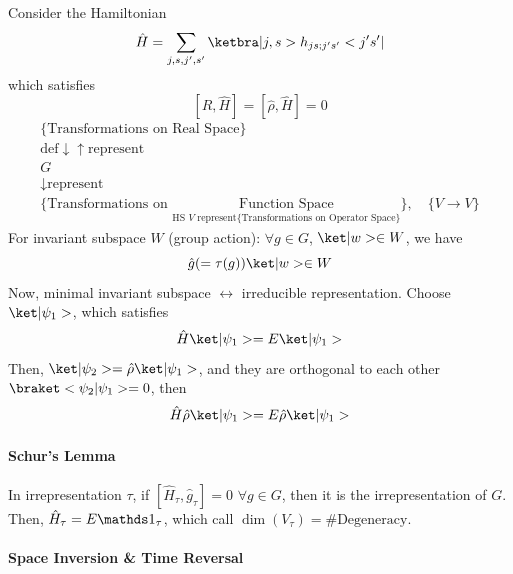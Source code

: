 Consider the Hamiltonian
\[
  \hat H = \sum_{j,s,j',s'} \ketbra|j,s>h_{js;j's'} <j's'|
\]
which satisfies
\[
  [\hat R, \hat H] = [\hat\rho, \hat H] = 0
\]
\[
  \begin{array}{c}
    \{\text{Transformations on Real Space}\}\\
    \text{def} \downarrow \uparrow \text{represent}\\
    G\\
    \downarrow \text{represent}\\
    \{\text{Transformations on
      $\underset{\text{HS $V$ represent}
        \{\text{Transformations on Operator Space}\}}
        {\text{Function Space}}$}\}, \quad \{V \to V\}
  \end{array}
\]
For invariant subspace $W$ (group action):
$\forall g \in G$, $\ket|w> \in W$, we have
\[
  \hat g (= \tau(g)) \ket|w> \in W
\]
Now, minimal invariant subspace $\leftrightarrow$ irreducible representation.
Choose $\ket|\psi_1>$, which satisfies
\[
  \hat H\ket|\psi_1> = E\ket|\psi_1>
\]
Then, $\ket|\psi_2> = \hat\rho\ket|\psi_1>$, and they are orthogonal to each
other $\braket<\psi_2|\psi_1> = 0$, then
\[
  \hat H \hat \rho \ket|\psi_1> = E\hat \rho \ket|\psi_1>
\]
\paragraph{Schur's Lemma}
In irrepresentation $\tau$, if $[\hat H_\tau, \hat g_\tau] = 0$
$\forall g \in G$, then it is the irrepresentation of $G$.
Then, $\hat H_\tau = E\identity_\tau$,
which call $\dim(V_\tau) = \#\text{Degeneracy}$.

\paragraph{Space Inversion \& Time Reversal}

